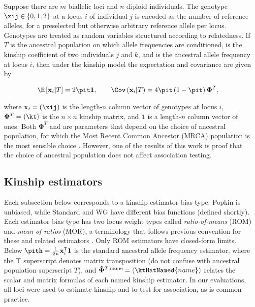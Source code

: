 \documentclass[11pt]{article}
\newcommand{\kinMat}[1][T]{%
  \ensuremath{%
    \mathbf{\Phi}^{#1}
  }%
  \xspace%
}%
\newcommand{\kinMatEstNamed}[1]{%
  \ensuremath{%
    \mathbf{\hat{\Phi}}^{T,\text{#1}}
  }%
  \xspace%
}%
\begin{document}
\begin{linenumbers}
Suppose there are $m$ biallelic loci and $n$ diploid individuals.
The genotype $\xij \in \{0,1,2\}$ at a locus $i$ of individual $j$ is encoded as the number of reference alleles, for a preselected but otherwise arbitrary reference allele per locus.
Genotypes are treated as random variables structured according to relatedness.
If $T$ is the ancestral population on which allele frequencies are conditioned, \kt is the kinship coefficient of two individuals $j$ and $k$, and \pit is the ancestral allele frequency at locus $i$, then under the kinship model \citep{malecot_mathematiques_1948, wright_genetical_1949, jacquard_structures_1970, astle_population_2009, ochoa_estimating_2021} the expectation and covariance are given by
\begin{linenomath*}
\begin{align*}
  \E \left[ \mathbf{x}_i \middle| T \right]
  =
    2 \pit \mathbf{1}
  ,
  \quad\quad
  \Cov \left(\mathbf{x}_i \middle| T \right)
  =
    4 \pit \left( 1 - \pit \right) \kinMat
    ,
\end{align*}
\end{linenomath*}
where $\mathbf{x}_i = (\xij)$ is the length-$n$ column vector of genotypes at locus $i$, $\kinMat = (\kt)$ is the $n \times n$ kinship matrix, and $\mathbf{1}$ is a length-$n$ column vector of ones.
Both \kinMat and \pit are parameters that depend on the choice of ancestral population, for which the Most Recent Common Ancestor (MRCA) population is the most sensible choice \citep{ochoa_estimating_2021}.
However, one of the results of this work is proof that the choice of ancestral population does not affect association testing.

\subsection{Kinship estimators}

Each subsection below corresponds to a kinship estimator bias type: Popkin is unbiased, while Standard and WG have different bias functions (defined shortly).
Each estimator bias type has two locus weight types called \textit{ratio-of-means} (ROM) and \textit{mean-of-ratios} (MOR), a terminology that follows previous convention for these and related estimators \citep{bhatia_estimating_2013, ochoa_estimating_2021}.
Only ROM estimators have closed-form limits.
Below
$
\pith
=
\frac{1}{2n} \mathbf{x}_i^\intercal \mathbf{1}
$
is the standard ancestral allele frequency estimator,
where the $\intercal$ superscript denotes matrix transposition (do not confuse with ancestral population superscript $T$),
and
$\kinMatEstNamed{name} = (\ktHatNamed{name})$
relates the scalar and matrix formulas of each named kinship estimator.
In our evaluations, all loci were used to estimate kinship and to test for association, as is common practice.


\end{linenumbers}
\end{document}
